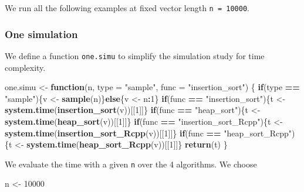 \documentclass[
]{article}
\newenvironment{Shaded}{\begin{snugshade}}{\end{snugshade}}
\newcommand{\AttributeTok}[1]{\textcolor[rgb]{0.13,0.29,0.53}{#1}}
\newcommand{\ControlFlowTok}[1]{\textcolor[rgb]{0.13,0.29,0.53}{\textbf{#1}}}
\newcommand{\DecValTok}[1]{\textcolor[rgb]{0.00,0.00,0.81}{#1}}
\newcommand{\FunctionTok}[1]{\textcolor[rgb]{0.13,0.29,0.53}{\textbf{#1}}}
\newcommand{\NormalTok}[1]{#1}
\newcommand{\OtherTok}[1]{\textcolor[rgb]{0.56,0.35,0.01}{#1}}
\newcommand{\SpecialCharTok}[1]{\textcolor[rgb]{0.81,0.36,0.00}{\textbf{#1}}}
\newcommand{\StringTok}[1]{\textcolor[rgb]{0.31,0.60,0.02}{#1}}
\begin{document}
We run all the following examples at fixed vector length
\texttt{n\ =\ 10000}.

\subsubsection{One simulation}\label{one-simulation}

We define a function \texttt{one.simu} to simplify the simulation study
for time complexity.

\begin{Shaded}
\begin{Highlighting}[]
\NormalTok{one.simu }\OtherTok{\textless{}{-}} \ControlFlowTok{function}\NormalTok{(n, }\AttributeTok{type =} \StringTok{"sample"}\NormalTok{, }\AttributeTok{func =} \StringTok{"insertion\_sort"}\NormalTok{)}
\NormalTok{\{}
  \ControlFlowTok{if}\NormalTok{(type }\SpecialCharTok{==} \StringTok{"sample"}\NormalTok{)\{v }\OtherTok{\textless{}{-}} \FunctionTok{sample}\NormalTok{(n)\}}\ControlFlowTok{else}\NormalTok{\{v }\OtherTok{\textless{}{-}}\NormalTok{ n}\SpecialCharTok{:}\DecValTok{1}\NormalTok{\}}
  \ControlFlowTok{if}\NormalTok{(func }\SpecialCharTok{==} \StringTok{"insertion\_sort"}\NormalTok{)\{t }\OtherTok{\textless{}{-}} \FunctionTok{system.time}\NormalTok{(}\FunctionTok{insertion\_sort}\NormalTok{(v))[[}\DecValTok{1}\NormalTok{]]\}}
  \ControlFlowTok{if}\NormalTok{(func }\SpecialCharTok{==} \StringTok{"heap\_sort"}\NormalTok{)\{t }\OtherTok{\textless{}{-}} \FunctionTok{system.time}\NormalTok{(}\FunctionTok{heap\_sort}\NormalTok{(v))[[}\DecValTok{1}\NormalTok{]]\} }
  \ControlFlowTok{if}\NormalTok{(func }\SpecialCharTok{==} \StringTok{"insertion\_sort\_Rcpp"}\NormalTok{)\{t }\OtherTok{\textless{}{-}} \FunctionTok{system.time}\NormalTok{(}\FunctionTok{insertion\_sort\_Rcpp}\NormalTok{(v))[[}\DecValTok{1}\NormalTok{]]\}}
  \ControlFlowTok{if}\NormalTok{(func }\SpecialCharTok{==} \StringTok{"heap\_sort\_Rcpp"}\NormalTok{)\{t }\OtherTok{\textless{}{-}} \FunctionTok{system.time}\NormalTok{(}\FunctionTok{heap\_sort\_Rcpp}\NormalTok{(v))[[}\DecValTok{1}\NormalTok{]]\}}
  \FunctionTok{return}\NormalTok{(t)}
\NormalTok{\}}
\end{Highlighting}
\end{Shaded}

We evaluate the time with a given \texttt{n} over the 4 algorithms. We
choose

\begin{Shaded}
\begin{Highlighting}[]
\NormalTok{n }\OtherTok{\textless{}{-}} \DecValTok{10000}
\end{Highlighting}
\end{Shaded}
\end{document}

